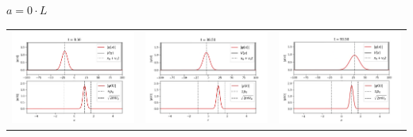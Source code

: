 \documentclass[11pt]{article}
\begin{document}
$a = 0\cdot L$ \\
\begin{tabular}{ccc}
	\includegraphics[scale=0.2]{sh_0_8_50} & 
	\includegraphics[scale=0.2]{sh_0_38_50} & 
	\includegraphics[scale=0.2]{sh_0_93_50} \\
\end{tabular}
\end{document}
